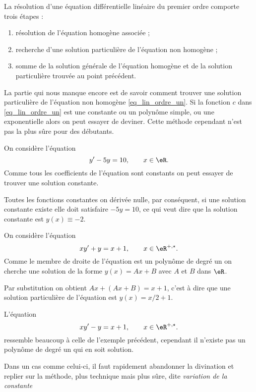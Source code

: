 \begin{Aretenir}
  La résolution d'une équation différentielle linéaire du premier ordre comporte trois étapes :
  \begin{enumerate}
  \item résolution de l'équation homogène associée ;
  \item recherche d'une solution particulière de l'équation non homogène ;
  \item somme de la solution générale de l'équation homogène et de la solution particulière trouvée au point précédent.
  \end{enumerate}
\end{Aretenir}
La partie qui nous manque encore est de savoir comment trouver une solution particulière de l'équation non homogène \eqref{eq_lin_ordre_un}. Si la fonction $c$ dans \eqref{eq_lin_ordre_un} est une constante ou un polynôme simple, ou une exponentielle alors on peut essayer de deviner. Cette méthode cependant n'est pas la plus sûre pour des débutants.  

\begin{example}
  On considère l'équation 
  \begin{equation}
    y'-5y = 10, \qquad x\in\eR.
  \end{equation}
Comme tous les coefficients de l'équation sont constants on peut essayer de trouver une solution constante. 

Toutes les fonctions constantes on dérivée nulle, par conséquent, si une solution constante existe elle doit satisfaire $-5y = 10$, ce qui veut dire que la solution constante est $y(x)\equiv -2$. 
\end{example}

\begin{example}
  On considère l'équation 
  \begin{equation}
    xy'+y = x+1, \qquad x\in\eR^{+,\star}.
  \end{equation}
Comme le membre de droite de l'équation est un polynôme de degré un on cherche une solution de la forme $y(x) = Ax + B$ avec $A$ et $B$ dans $\eR$.

Par substitution on obtient $Ax + (Ax +B) = x+1$, c'est à dire que une solution particulière de l'équation est $y(x) = x/2+1$. 
\end{example}

\begin{example}
   L'équation 
  \begin{equation}
    xy'-y = x+1, \qquad x\in\eR^{+,\star}.
  \end{equation}
ressemble beaucoup à celle de l'exemple précédent, cependant il n'existe pas un polynôme de degré un qui en soit solution. 

Dans un cas comme celui-ci, il faut rapidement abandonner la divination et replier sur la méthode, plus technique mais plus sûre, dite  \emph{variation de la constante} 
\end{example}


